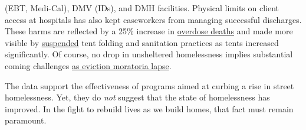 \documentclass[11pt]{article}
\begin{document}
(EBT, Medi-Cal), DMV (IDs), and DMH facilities. Physical limits on client access at 
hospitals has also kept caseworkers from managing successful discharges. These harms 
are reflected by a 25\% increase in 
\href{https://www.latimes.com/california/story/2021-01-07/the-powerful-synthetic-opioid-fentanyl-is-behind-rising-deaths-in-the-homeless-population}{overdose deaths} and made more visible by \href{https://clkrep.lacity.org/onlinedocs/2020/20-0147_misc_3-17-20_p.pdf}{suspended}
tent folding and sanitation practices as tents increased significantly. 
Of course, no drop in unsheltered homelessness implies substantial coming challenges
 \href{https://www.latimes.com/california/story/2021-01-12/new-report-foresees-tens-of-thousands-losing-homes-by-2023}{as eviction moratoria lapse}.

The data support the effectiveness of programs aimed at curbing a rise in street homelessness.
Yet, they do {\it not} suggest that the state of homelessness has improved. In the fight to rebuild 
lives as we build homes, that fact must remain paramount.

\end{document}
